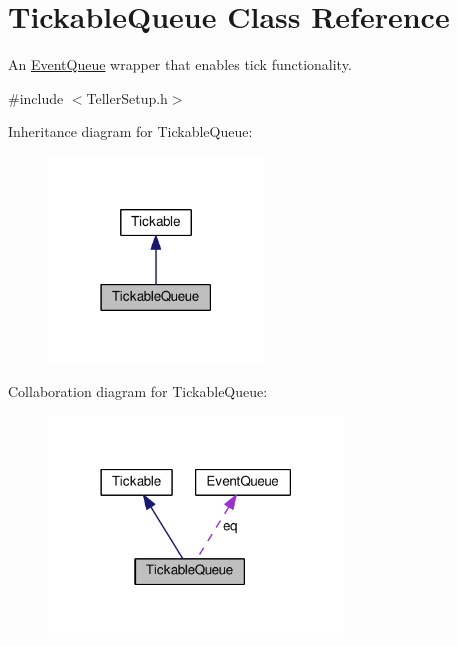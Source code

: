 \hypertarget{class_tickable_queue}{}\section{Tickable\+Queue Class Reference}
\label{class_tickable_queue}


An \hyperlink{class_event_queue}{Event\+Queue} wrapper that enables tick functionality.  




{\ttfamily \#include $<$Teller\+Setup.\+h$>$}



Inheritance diagram for Tickable\+Queue\+:
\nopagebreak
\begin{figure}[H]
\begin{center}
\leavevmode
\includegraphics[width=162pt]{class_tickable_queue__inherit__graph}
\end{center}
\end{figure}


Collaboration diagram for Tickable\+Queue\+:
\nopagebreak
\begin{figure}[H]
\begin{center}
\leavevmode
\includegraphics[width=222pt]{class_tickable_queue__coll__graph}
\end{center}
\end{figure}
